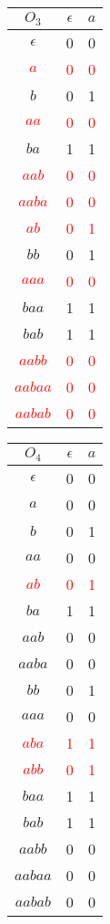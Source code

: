 \begin{minipage}{0.25\linewidth}
	\centering
	\begin{tabular}{|c|cc|}
		\hline
		$O_3$ & $\epsilon$ & $a$\\
		\hline
		$\epsilon$ & 0 &0\\
		\textcolor{red}{$a$}&\textcolor{red}{0}&\textcolor{red}{0}\\
		$b$&0&1\\
		\textcolor{red}{$aa$}&\textcolor{red}{0}&\textcolor{red}{0}\\
		$ba$&1&1\\
		\textcolor{red}{$aab$}&\textcolor{red}{0}&\textcolor{red}{0}\\
		\textcolor{red}{$aaba$}&\textcolor{red}{0}&\textcolor{red}{0}\\
		\hline
		\textcolor{red}{$ab$}&\textcolor{red}{0}&\textcolor{red}{1}\\
		$bb$&0&1\\
		\textcolor{red}{$aaa$}&\textcolor{red}{0}&\textcolor{red}{0}\\
		$baa$&1&1\\
		$bab$&1&1\\
		\textcolor{red}{$aabb$}&\textcolor{red}{0}&\textcolor{red}{0}\\
		\textcolor{red}{$aabaa$}&\textcolor{red}{0}&\textcolor{red}{0}\\
		\textcolor{red}{$aabab$}&\textcolor{red}{0}&\textcolor{red}{0}\\
		\hline
	\end{tabular}
\end{minipage}
\begin{minipage}{0.33\linewidth}
	\centering
	\begin{tabular}{|c|cc|}
		\hline
		$O_4$ & $\epsilon$ & $a$\\
		\hline
		$\epsilon$ & 0 &0\\
		$a$&0&0\\
		$b$&0&1\\
		$aa$&0&0\\
		\textcolor{red}{$ab$}&\textcolor{red}{0}&\textcolor{red}{1}\\
		$ba$&1&1\\
		$aab$&0&0\\
		$aaba$&0&0\\
		\hline
		$bb$&0&1\\
		$aaa$&0&0\\
		\textcolor{red}{$aba$}&\textcolor{red}{1}&\textcolor{red}{1}\\
		\textcolor{red}{$abb$}&\textcolor{red}{0}&\textcolor{red}{1}\\
		$baa$&1&1\\
		$bab$&1&1\\
		$aabb$&0&0\\
		$aabaa$&0&0\\
		$aabab$&0&0\\
		\hline
	\end{tabular}
\end{minipage}
